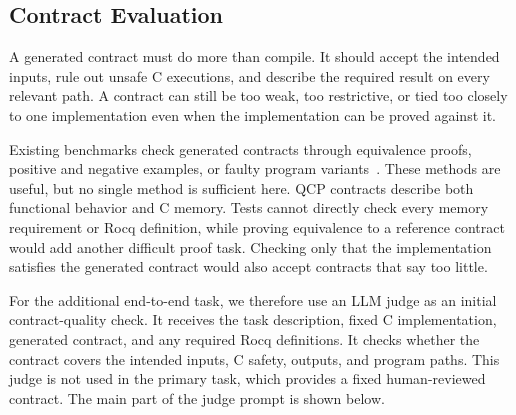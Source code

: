 \subsection{Contract Evaluation}
\label{app:why-program-verification}

A generated contract must do more than compile. It should accept the intended inputs, rule out unsafe C executions, and describe the required result on every relevant path. A contract can still be too weak, too restrictive, or tied too closely to one implementation even when the implementation can be proved against it.

Existing benchmarks check generated contracts through equivalence proofs, positive and negative examples, or faulty program variants~\cite{thakur2025clever,ye2026verina,lecong2025formalbench,yang2026coins}. These methods are useful, but no single method is sufficient here. QCP contracts describe both functional behavior and C memory. Tests cannot directly check every memory requirement or Rocq definition, while proving equivalence to a reference contract would add another difficult proof task. Checking only that the implementation satisfies the generated contract would also accept contracts that say too little.

For the additional end-to-end task, we therefore use an LLM judge as an initial contract-quality check. It receives the task description, fixed C implementation, generated contract, and any required Rocq definitions. It checks whether the contract covers the intended inputs, C safety, outputs, and program paths. This judge is not used in the primary task, which provides a fixed human-reviewed contract. The main part of the judge prompt is shown below.


